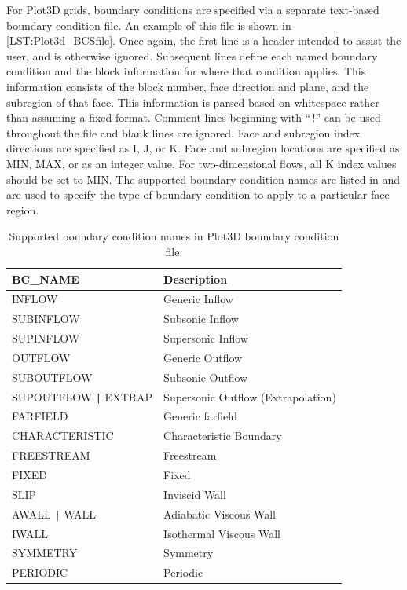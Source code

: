 For Plot3D grids, boundary conditions are specified via a separate
text-based boundary condition file.
%
An example of this file is shown in \cref{LST:Plot3d_BCSfile}.
%
Once again, the first line is a header intended to assist the user,
and is otherwise ignored.
%
%
Subsequent lines define each named boundary condition and the
block information for where that condition applies.
%
This information consists of the block number, face direction and plane,
and the subregion of that face.
%
This information is parsed based on whitespace rather than assuming a
fixed format.
%
Comment lines beginning with ``\,!'' can be used throughout the
file and blank lines are ignored.
%
Face and subregion index directions are specified as I, J, or K.
%
Face and subregion locations are specified as MIN, MAX, or as an
integer value.
%
For two-dimensional flows, all K index values should be set to MIN.
%
The supported boundary condition names are listed in
and are used to specify the type of boundary condition to apply
to a particular face region.
%
\begin{table}
\begin{center}
\caption{Supported boundary condition names in Plot3D boundary condition file.}
\label{TAB:Plot3dBCSFileBCNames}
\begin{tabular}{ll}
  BC\_NAME              &  Description \\
  \hline
  INFLOW                &  Generic Inflow \\
  SUBINFLOW             &  Subsonic Inflow \\
  SUPINFLOW             &  Supersonic Inflow \\
  OUTFLOW               &  Generic Outflow \\
  SUBOUTFLOW            &  Subsonic Outflow \\
  SUPOUTFLOW \verb$|$
  EXTRAP                &  Supersonic Outflow (Extrapolation) \\
  FARFIELD              &  Generic farfield \\
  CHARACTERISTIC        &  Characteristic Boundary \\
  FREESTREAM            &  Freestream \\
  FIXED                 &  Fixed \\
  SLIP                  &  Inviscid Wall \\
  AWALL \verb$|$        
  WALL                  &  Adiabatic Viscous Wall \\
  IWALL                 &  Isothermal Viscous Wall \\
  SYMMETRY              &  Symmetry \\
  PERIODIC              &  Periodic
\end{tabular}
\end{center}
\end{table}
